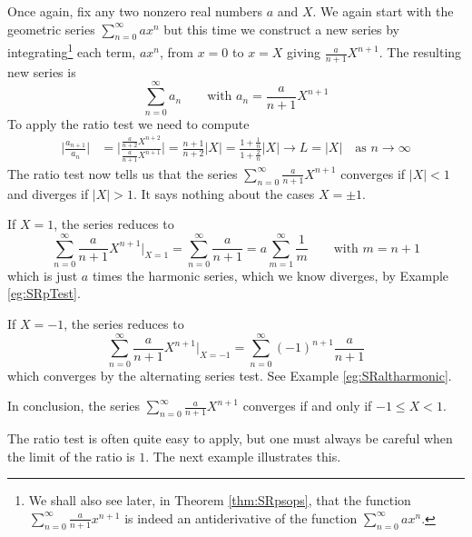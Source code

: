 \begin{eg}[$\sum_{n=0}^\infty \frac{a}{n+1} X^{n + 1}$]\label{eg:SRratioB}
Once again, fix any two nonzero real numbers $a$ and $X$.
We again start with the geometric series $\sum_{n=0}^\infty a x^n$
but this time we construct a new series by integrating\footnote{We shall
also see later, in Theorem \ref{thm:SRpsops}, that the function
$\sum_{n=0}^\infty \frac{a}{n+1} x^{n + 1}$ is indeed an antiderivative
of the function $\sum_{n=0}^\infty a x^n$.} each term,
$a x^n$, from $x=0$ to $x=X$ giving $\frac{a}{n+1} X^{n + 1}$. The resulting
new series is
\begin{equation*}
\sum_{n=0}^\infty a_n\qquad\text{with }a_n = \frac{a}{n+1} X^{n + 1}
\end{equation*}
To apply the ratio test we need to compute
\begin{align*}
\Big|\frac{a_{n+1}}{a_n}\Big|
&= \bigg|\frac{\frac{a}{n+2} X^{n + 2}}{\frac{a}{n+1} X^{n + 1}}\bigg|
 = \frac{n+1}{n+2} |X|
 = \frac{1+\frac{1}{n}}{1+\frac{2}{n}} |X|
\rightarrow L=|X|\quad\text{as $n\rightarrow\infty$}
\end{align*}
The ratio test now tells us that the series
$\sum_{n=0}^\infty \frac{a}{n+1} X^{n + 1}$
converges if $|X|<1$ and diverges if $|X|>1$. It says nothing
about the cases $X=\pm 1$.

 If $X=1$, the series reduces to
\begin{equation*}
\sum_{n=0}^\infty \frac{a}{n+1} X^{n + 1}\bigg|_{X=1}
=\sum_{n=0}^\infty \frac{a}{n+1}
=a\sum_{m=1}^\infty \frac{1}{m}\qquad\text{with }m=n+1
\end{equation*}
which is just $a$ times the harmonic series, which we know diverges,
by Example \ref{eg:SRpTest}.

If $X=-1$, the series reduces to
\begin{equation*}
\sum_{n=0}^\infty \frac{a}{n+1} X^{n + 1}\bigg|_{X=-1}
=\sum_{n=0}^\infty (-1)^{n+1}\frac{a}{n+1}
\end{equation*}
which converges by the alternating series test.
See Example \ref{eg:SRaltharmonic}.

In conclusion, the series $\sum_{n=0}^\infty \frac{a}{n+1} X^{n + 1}$
converges if and only if $-1\le X<1$.
\end{eg}

The ratio test is often quite easy to apply, but one must always be
careful when the limit of the ratio is $1$. The next example
illustrates this.


